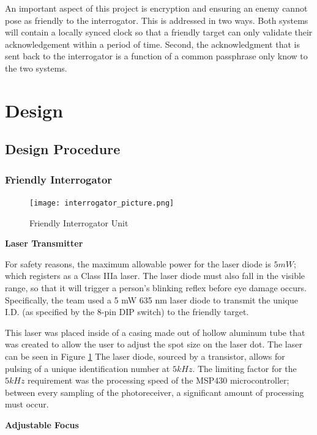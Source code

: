 \documentclass[letterpaper,10pt]{article}
\begin{document}
\begin{spacing}{1.15}
An important aspect of this project is encryption and ensuring an enemy cannot pose as friendly to the interrogator. This is addressed in two ways. Both systems will contain a locally synced clock so that a friendly target can only validate their acknowledgement within a period of time. Second, the acknowledgment that is sent back to the interrogator is a function of a common passphrase only know to the two systems.


\section{Design}

\subsection{Design Procedure} 

\subsubsection{Friendly Interrogator}
\begin{figure} [H]
	\centering
	\texttt{[image: interrogator\_picture.png]}
	\caption{Friendly Interrogator Unit\label{fig:interrogator-picture}}
\end{figure}

\hspace{5mm}\textbf{Laser Transmitter} \label{section:laser-transmitter-design-procedure}

For safety reasons, the maximum allowable power for the laser diode is $5mW$; which registers as a Class IIIa laser. The laser diode must also fall in the visible range, so that it will trigger a person's blinking reflex before eye damage occurs. Specifically, the team used a 5 mW 635 nm laser diode to transmit the unique I.D. (as specified by the 8-pin DIP switch) to the friendly target. 

This laser was placed inside of a casing made out of hollow aluminum tube that was created to allow the user to adjust the spot size on the laser dot. The laser can be seen in Figure \ref{fig:interrogator-picture} The laser diode, sourced by a transistor, allows for pulsing of a unique identification number at $5kHz$. The limiting factor for the $5kHz$ requirement was the processing speed of the MSP430 microcontroller; between every sampling of the photoreceiver, a significant amount of processing must occur. 

\hspace{5mm} \textbf{Adjustable Focus}


\end{spacing}
\end{document}
